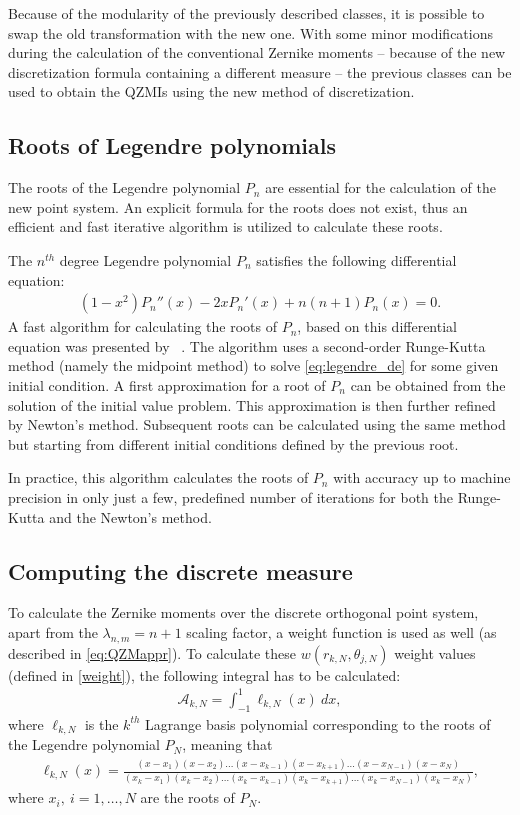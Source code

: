 Because of the modularity of the previously described classes, it is possible to swap the old transformation with the new one. With some minor modifications during the calculation of the conventional Zernike moments -- because of the new discretization formula containing a different measure -- the previous classes can be used to obtain the QZMIs using the new method of discretization.

\subsection{Roots of Legendre polynomials}
The roots of the Legendre polynomial $P_n$ are essential for the calculation of the new point system. An explicit formula for the roots does not exist, thus an efficient and fast iterative algorithm is utilized to calculate these roots.

The $n^{th}$ degree Legendre polynomial $P_n$ satisfies the following differential equation:
\begin{gather}
    (1-x^2)P_n''(x) - 2xP_n'(x) + n(n+1)P_n(x) = 0.\label{eq:legendre_de}
\end{gather}
A fast algorithm for calculating the roots of $P_n$, based on this differential equation was presented by \citeauthor{legendre_algo}~\cite{legendre_algo}. The algorithm uses a second-order Runge-Kutta method (namely the midpoint method) to solve \eqref{eq:legendre_de} for some given initial condition. A first approximation for a root of $P_n$ can be obtained from the solution of the initial value problem. This approximation is then further refined by Newton's method.
Subsequent roots can be calculated using the same method but starting from different initial conditions defined by the previous root.

In practice, this algorithm calculates the roots of $P_n$ with accuracy up to machine precision in only just a few, predefined number of iterations for both the Runge-Kutta and the Newton's method.

\subsection{Computing the discrete measure}
To calculate the Zernike moments over the discrete orthogonal point system, apart from the $\lambda_{n,m} = n + 1$ scaling factor, a weight function is used as well (as described in \eqref{eq:QZMappr}). To calculate these $w(r_{k,N},\theta_{j,N})$ weight values (defined in \eqref{weight}), the following integral has to be calculated:
\begin{gather*}
    \mathcal{A}_{k,N} = \int_{-1}^{1}\ell_{k,N}(x)\ dx,
\end{gather*}
where $\ell_{k,N}$ is the $k^{th}$ Lagrange basis polynomial corresponding to the roots of the Legendre polynomial $P_N$, meaning that
\begin{gather*}
    \ell_{k,N}(x) = \frac{(x - x_1)(x - x_2)\ldots(x - x_{k-1})(x - x_{k+1})\ldots(x - x_{N-1})(x - x_N)}{(x_k - x_1)(x_k - x_2)\ldots(x_k - x_{k-1})(x_k - x_{k+1})\ldots(x_k - x_{N-1})(x_k - x_N)},
\end{gather*}
where $x_i, \ i = 1,\ldots,N$ are the roots of $P_N$.


